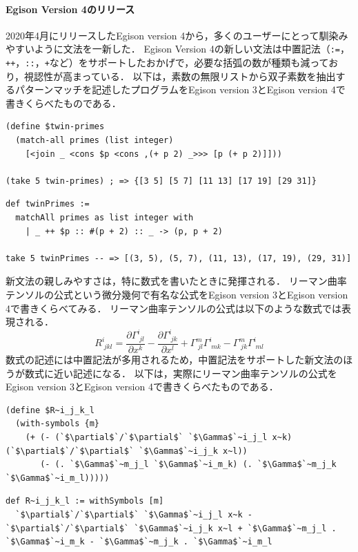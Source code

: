 \begin{oframed}
  \paragraph{Egison Version 4のリリース}
2020年4月にリリースしたEgison version 4から，多くのユーザーにとって馴染みやすいように文法を一新した．
Egison Version 4の新しい文法は中置記法（\lstinline{:=}，\lstinline{++}，\lstinline{::}，\lstinline{+}など）をサポートしたおかげで，必要な括弧の数が種類も減っており，視認性が高まっている．
以下は，素数の無限リストから双子素数を抽出するパターンマッチを記述したプログラムをEgison version 3とEgison version 4で書きくらべたものである．
\begin{lstlisting}[caption=Egison version 3,language=egison,numbers=none]
(define $twin-primes
  (match-all primes (list integer)
    [<join _ <cons $p <cons ,(+ p 2) _>>> [p (+ p 2)]]))

(take 5 twin-primes) ; => {[3 5] [5 7] [11 13] [17 19] [29 31]}
\end{lstlisting}
\begin{lstlisting}[caption=Egison version 4,language=egison,numbers=none]
def twinPrimes :=
  matchAll primes as list integer with
    | _ ++ $p :: #(p + 2) :: _ -> (p, p + 2)

take 5 twinPrimes -- => [(3, 5), (5, 7), (11, 13), (17, 19), (29, 31)]
\end{lstlisting}

新文法の親しみやすさは，特に数式を書いたときに発揮される．
リーマン曲率テンソルの公式という微分幾何で有名な公式をEgison version 3とEgison version 4で書きくらべてみる．
リーマン曲率テンソルの公式は以下のような数式では表現される．
\[R^{i}_{\;jkl} = \frac{\partial \Gamma^{i}_{\;jl}}{\partial x^k} - \frac{\partial \Gamma^{i}_{\;jk}}{\partial x^l} + \Gamma^{m}_{\;jl} \Gamma^{i}_{\;mk} - \Gamma^{m}_{\;jk} \Gamma^{i}_{\;ml} \]
数式の記述には中置記法が多用されるため，中置記法をサポートした新文法のほうが数式に近い記述になる．
以下は，実際にリーマン曲率テンソルの公式をEgison version 3とEgison version 4で書きくらべたものである．
\begin{lstlisting}[caption=Egison version 3,language=egison,numbers=none]
(define $R~i_j_k_l
  (with-symbols {m}
    (+ (- (`$\partial$`/`$\partial$` `$\Gamma$`~i_j_l x~k) (`$\partial$`/`$\partial$` `$\Gamma$`~i_j_k x~l))
       (- (. `$\Gamma$`~m_j_l `$\Gamma$`~i_m_k) (. `$\Gamma$`~m_j_k `$\Gamma$`~i_m_l)))))
\end{lstlisting}
\begin{lstlisting}[caption=Egison version 4,language=egison,numbers=none]
def R~i_j_k_l := withSymbols [m]
  `$\partial$`/`$\partial$` `$\Gamma$`~i_j_l x~k - `$\partial$`/`$\partial$` `$\Gamma$`~i_j_k x~l + `$\Gamma$`~m_j_l . `$\Gamma$`~i_m_k - `$\Gamma$`~m_j_k . `$\Gamma$`~i_m_l
\end{lstlisting}
\end{oframed}


